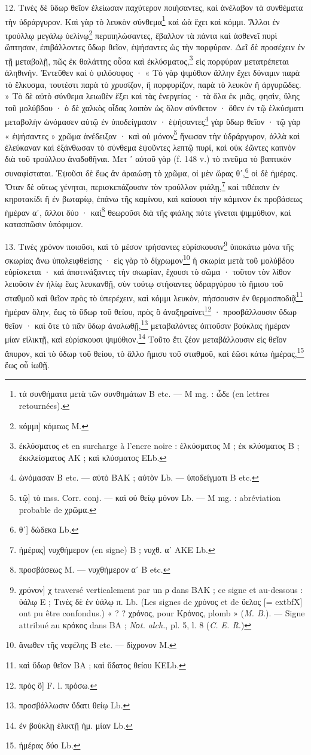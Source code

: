\documentclass[a4paper, 11pt, oneside, polutonikogreek, french]{article}
\begin{document}
12. Τινὲς δὲ ὕδωρ θεῖον ἐλείωσαν παχύτερον ποιήσαντες, καὶ ἀνέλαβον τὰ συνθέματα τὴν ὑδράργυρον. Καὶ γὰρ τὸ λευκὸν σύνθεμα\footnote{τά συνθήματα μετὰ τῶν συνθημάτων B etc. --- M mg. : ὧδε (en lettres retournées).} καὶ ὠὰ ἔχει καὶ κόμμι. Ἄλλοι ἐν τρούλλῳ μεγάλῳ ὑελίνῳ\footnote{κόμμι] κόμεως M.} περιπηλώσαντες, ἔβαλλον τὰ πάντα καὶ ἀσθενεῖ πυρὶ ὤπτησαν, ἐπιβάλλοντες ὕδωρ θεῖον, ἑψήσαντες ὡς τὴν πορφύραν. Δεῖ δὲ προσέχειν ἐν τῇ μεταβολῇ, πῶς ἐκ θαλάττης οὖσα καὶ ἐκλύσματος,\footnote{ἐκλύσματος et en surcharge à l'encre noire : ἑλκύσματος M ; ἐκ κλύσματος B ; ἐκκλείσματος AK ; καὶ κλύσματος ELb.} εἰς πορφύραν μετατρέπεται ἀληθινήν. Ἐντεῦθεν καὶ ὁ φιλόσοφος · « Τὸ γὰρ ψιμύθιον ἄλλην ἔχει δύναμιν παρὰ τὸ ἕλκυσμα, τουτέστι παρὰ τὸ χρυσίζον, ἢ πορφυρίζον, παρὰ τὸ λευκὸν ἢ ἀργυρῶδες. » Τὸ δὲ αὐτὸ σύνθεμα λειωθὲν ἕξει καὶ τὰς ἐνεργείας · τὰ ὅλα ἐκ μιᾶς, φησὶν, ὕλης τοῦ μολύβδου · ὁ δὲ χαλκὸς οἶδας λοιπὸν ὡς ὅλον σύνθετον · ὅθεν ἐν τῷ ἑλκύσματι μεταβολὴν ὠνόμασεν αὐτῷ ἐν ὑποδείγμασιν · ἑψήσαντες\footnote{ὠνόμασαν B etc. --- αὐτὸ BAK ; αὐτὸν Lb. --- ὑποδείγματι B etc.} γὰρ ὕδωρ θεῖον · τῷ γὰρ « ἐψήσαντες » χρῶμα ἀνέδειξαν · καὶ οὐ μόνον\footnote{τῷ] τὸ mss. Corr. conj. --- καὶ οὐ θείῳ μόνον Lb. --- M mg. : abréviation probable de χρῶμα.} ἥνωσαν τὴν ὑδράργυρον, ἀλλὰ καὶ ἐλεύκαναν καὶ ἐξάνθωσαν τὸ σύνθεμα ἑψοῦντες λεπτῷ πυρί, καὶ οὐκ ἐῶντες καπνὸν διὰ τοῦ τρούλλου ἀναδοθῆναι. Μετ ᾽ αὐτοῦ γὰρ (f. 148 v.) τὸ πνεῦμα τὸ βαπτικὸν συναφίσταται. Ἑψοῦσι δὲ ἕως ἂν ἀραιώσῃ τὸ χρῶμα, οἱ μὲν ὥρας θʹ,\footnote{θʹ] δώδεκα Lb.} οἱ δὲ ἡμέρας. Ὅταν δὲ οὕτως γένηται, περισκεπάζουσιν τὸν τρούλλον φιάλῃ,\footnote{ἡμέρας] νυχθήμερον (en signe) B ; νυχθ. αʹ AKE Lb.} καὶ τιθέασιν ἐν κηροτακίδι ἢ ἐν βωταρίῳ, ἐπάνω τῆς καμίνου, καὶ καίουσι τὴν κάμινον ἐκ προβάσεως ἡμέραν αʹ, ἄλλοι δύο · καὶ\footnote{προσβάσεως M. --- νυχθήμερον αʹ B etc.} θεωροῦσι διὰ τῆς φιάλης πότε γίνεται ψιμμύθιον, καὶ κατασπῶσιν ὑπόφιμον.

13. Τινὲς χρόνον ποιοῦσι, καὶ τὸ μέσον τρήσαντες εὑρίσκουσιν\footnote{χρόνον] χ traversé verticalement par un ρ dans BAK ; ce signe et au-dessous : ὑάλῳ E ; Τινὲς δὲ ἐν ὑάλῳ π. Lb. (Les signes de χρόνος et de ὕελος [= 	extbf{Χ}] ont pu être confondus.) « ? ? χρόνος, pour Κρόνος, plomb » (\emph{M. B.}). --- Signe attribué au κρόκος dans BA ; \emph{Nοt. alch.}, pl. 5, l. 8 (\emph{C. E. R.})} ὑποκάτω μόνα τῆς σκωρίας ἄνω ὑπολειφθείσης · εἰς γὰρ τὸ δίχρωμον\footnote{ἄνωθεν τῆς νεφέλης B etc. --- δίχρονον M.} ἡ σκωρία μετὰ τοῦ μολύβδου εὑρίσκεται · καὶ ἀποτινάξαντες τὴν σκωρίαν, ἔχουσι τὸ σῶμα · τοῦτον τὸν λίθον λειοῦσιν ἐν ἡλίῳ ἕως λευκανθῇ, σὺν τούτῳ στήσαντες ὑδραργύρου τὸ ἥμισυ τοῦ σταθμοῦ καὶ θεῖον πρὸς τὸ ὑπερέχειν, καὶ κόμμι λευκὸν, πήσσουσιν ἐν θερμοσποδιᾷ\footnote{καὶ ὕδωρ θεῖον BA ; καὶ ὕδατος θείου KELb.} ἡμέραν ὅλην, ἕως τὸ ὕδωρ τοῦ θείου, πρὸς ὃ ἀναξηραίνει\footnote{πρὸς ὃ] F. l. πρόσω.} · προσβάλλουσιν ὕδωρ θεῖον · καὶ ὅτε τὸ πᾶν ὕδωρ ἀναλωθῇ,\footnote{προσβάλλωσιν ὕδατι θείῳ Lb.} μεταβαλόντες ὀπτοῦσιν βούκλας ἡμέραν μίαν εἱλικτῇ, καὶ εὑρίσκουσι ψιμύθιον.\footnote{ἐν βούκλῃ ἑλικτῇ ἡμ. μίαν Lb.} Τοῦτο ἔτι ζέον μεταβάλλουσιν εἰς θεῖον ἄπυρον, καὶ τὸ ὕδωρ τοῦ θείου, τὸ ἄλλο ἥμισυ τοῦ σταθμοῦ, καὶ ἐῶσι κάτω ἡμέρας,\footnote{ἡμέρας δύο Lb.} ἕως οὗ ἰωθῇ.
\end{document}
